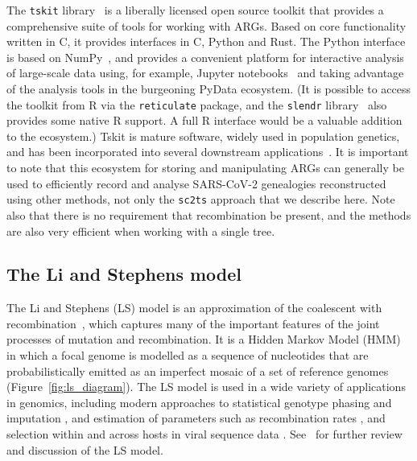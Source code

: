 \documentclass{article}
\begin{document}
The \texttt{tskit} library~\citep{Tskit2023-tskit} is a liberally
licensed open source toolkit that provides a comprehensive suite
of tools for working with ARGs. Based on core functionality written
in C, it provides interfaces in C, Python and Rust. The Python interface
is based on NumPy~\citep{Harris2020-array}, and provides a convenient
platform for interactive analysis of large-scale data using, for
example, Jupyter notebooks~\citep{Kluyver2016-jupyter} and taking
advantage of the analysis tools in the burgeoning PyData ecosystem.
(It is possible to access the toolkit from R via the \texttt{reticulate}
package, and the \texttt{slendr} library~\citep{Petr2022-slendr}
also provides some native R support. A full R interface would be a
valuable addition to the ecosystem.)
Tskit is mature software, widely used in population genetics, and
has been incorporated into several downstream
applications~\citep[e.g.][]{Haller2019-slim,Speidel2019-yh,
Terasaki2021-geonomics,
Fan2022-genealogical,Korfmann2022-weak,
Mahmoudi2022-bayesian,Petr2022-slendr,Rasmussen2022-espalier,
Zhang2023-lf}.
It is important to note that
this ecosystem for storing and manipulating ARGs can
generally be used to efficiently record and analyse SARS-CoV-2 genealogies reconstructed
using other methods, not only the \texttt{sc2ts} approach that we describe here.
Note also that there is no requirement that recombination be present,
and the methods are also very efficient when working with a single tree.

\subsection{The Li and Stephens model}
\label{sec:ls}
The Li and Stephens (LS) model \citep{Li2003-ib} is an approximation of the
coalescent with recombination~\citep{Hudson1983-properties}, which captures
many of the important features of the joint processes of mutation and
recombination. It is a Hidden Markov Model (HMM) in which a focal genome
is modelled as a
sequence of nucleotides that are probabilistically emitted as
an imperfect mosaic of a set of reference genomes
(Figure~\ref{fig:ls_diagram}).
The LS model is used in a wide variety
of applications in genomics, including modern approaches to
statistical genotype phasing and imputation
\citep{Delaneau2019-wl,Browning2021-cg,Browning2018-nk,Rubinacci2020-pa},
and estimation of parameters such as
recombination rates \citep[e.g.][]{Hinch2011-tz},
and selection within and across hosts in viral
sequence data \citep[e.g.][]{Palmer2019-wa}.
See~\cite{Mcvean2019-linkage} for further review and discussion
of the LS model.
\end{document}

